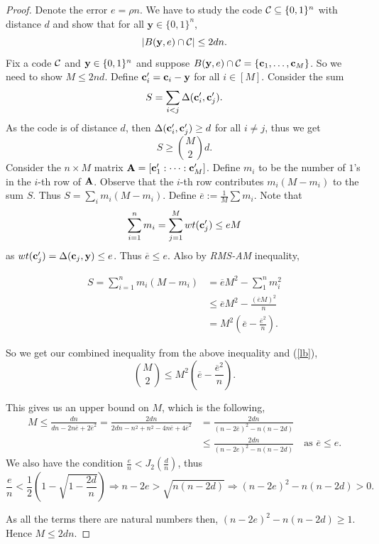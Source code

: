	\begin{proof}
		Denote the error $e = \rho n$. We have to study the code $\mathcal{C}\subseteq\{0,1\}^n$ with distance $d$ and show that for all $\mathbf{y}\in\{0,1\}^n$, 
		\[
		|B(\mathbf{y},e)\cap \mathcal{C}| \leq 2dn.
		\]
		Fix a code $\mathcal{C}$ and $\mathbf{y}\in\{0,1\}^n$ and suppose $B(\mathbf{y}, e)\cap\mathcal{C} = \{\mathbf{c}_1,\ldots,\mathbf{c}_M\}$. So we need to show $M\leq 2nd$. Define $\mathbf{c}_i' = \mathbf{c}_i-\mathbf{y}$ for all $i\in[M]$. Consider the sum 
		\[
		S = \sum_{i<j}\Delta(\mathbf{c}_i',\mathbf{c}_j').
		\]
		As the code is of distance $d$, then $\Delta(\mathbf{c}_i',\mathbf{c}_j')\geq d$ for all $i\neq j$, thus we get
		\begin{equation}
			\label{lb}
			S \geq \binom{M}{2}d.
		\end{equation}
		Consider the $n\times M$ matrix $\mathbf{A} = [\mathbf{c}_1' : \cdots : \mathbf{c}_M']$. Define $m_i$ to be the number of $1$'s in the $i$-th row of $\mathbf{A}$. Observe that the $i$-th row contributes $m_i(M-m_i)$ to the sum $S$. Thus $S = \sum_im_i(M-m_i)$.  Define $\overline{e} := \frac{1}{M}\sum m_i$. Note that 
		\[
		\sum_{i=1}^n m_i = \sum_{j=1}^M wt(\mathbf{c}_j') \leq eM
		\]
		as $wt(\mathbf{c}_j') = \Delta(\mathbf{c}_j, \mathbf{y}) \leq e$. Thus $\overline{e}\leq e$. Also by \emph{RMS-AM} inequality, 
		
		\begin{align*}
			S = \sum_{i=1}^n m_i(M-m_i) 
			& = \overline{e}M^2 - \sum_{1}^{n}m_i^2 \\
			& \leq \overline{e}M^2 - \frac{(\overline{e}M)^2}{n} \\
			&  = M^2(\overline{e} - \frac{\overline{e}^2}{n}).
		\end{align*}
		
		So we get our combined inequality from the above inequality and (\ref{lb}), 
		\[
		\binom{M}{2} \leq M^2(\overline{e} - \frac{\overline{e}^2}{n}).
		\]
		
		This gives us an upper bound on $M$, which is the following, 
		\begin{align*}
			M \leq \frac{dn}{dn - 2n\overline{e} + 2\overline{e}^2} = \frac{2dn}{2dn - n^2 + n^2 - 4n\overline{e} + 4\overline{e}^2} 
			& = \frac{2dn}{(n - 2\overline{e})^2 - n(n-2d)}\\
			& \leq \frac{2dn}{(n-2e)^2 - n(n-2d)} \quad \text{as $\overline{e} \leq e$}. 
		\end{align*}	
		We also have the condition $\frac{e}{n}<J_2(\frac{d}{n})$, thus 
		\[
		\frac{e}{n} < \frac{1}{2} \left( 1- \sqrt{1-\frac{2d}{n}} \right)
		\Rightarrow n-2e > \sqrt{n(n-2d)}
		\Rightarrow (n-2e)^2 - n(n-2d) > 0.
		\]
		
		As all the terms there are natural numbers then, $(n-2e)^2 - n(n-2d) \geq 1$. Hence $M\leq 2dn$.
		
	\end{proof}
	
